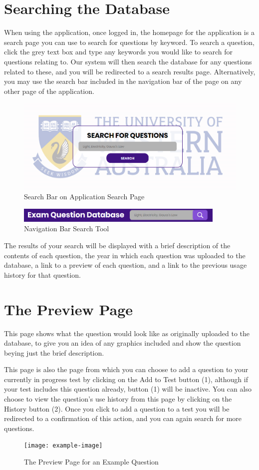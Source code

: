 \documentclass[12pt, a4paper, titlepage]{book}
\begin{document}
\section{Searching the Database}
When using the application, once logged in, the homepage for the application is a search page you can use to search for questions by keyword. To search a question, click the grey text box and type any keywords you would like to search for questions relating to. Our system will then search the database for any questions related to these, and you will be redirected to a search results page. Alternatively, you may use the search bar included in the navigation bar of the page on any other page of the application.
\begin{figure}[htp]
\centering
\includegraphics[width =12cm]{SearchPage.PNG}
\caption{Search Bar on Application Search Page}
\end{figure}
\begin{figure}[htp]
\centering
\includegraphics[width =10cm]{PagetopSearch.PNG}
\caption{Navigation Bar Search Tool}
\end{figure}

The results of your search will be displayed with a brief description of the contents of each question, the year in which each question was uploaded to the database, a link to a preview of each question, and a link to the previous usage history for that question.
\pagebreak
\section{The Preview Page}\label{sec:pre}
This page shows what the question would look like as originally uploaded to the database, to give you an idea of any graphics included and show the question beying just the brief description.\par
This page is also the page from which you can choose to add a question to your currently in progress test by clicking on the Add to Test button (1), although if your test includes this question already, button (1) will be inactive. You can also choose to view the question's use history from this page by clicking on the History button (2). Once you click to add a question to a test you will be redirected to a confirmation of this action, and you can again search for more questions.
\begin{figure}[H]
\centering
\texttt{[image: example-image]}
\caption{The Preview Page for an Example Question}
\end{figure}
\end{document}
